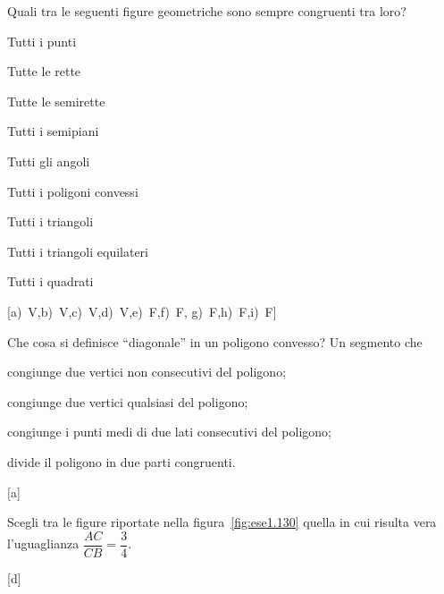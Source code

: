\begin{esercizio}
\label{ese:1.128}
Quali tra le seguenti figure geometriche sono sempre congruenti tra 
loro?
\begin{multicols}{2}
\begin{enumeratea}
\item Tutti i punti                \hfill \boxV\quad\boxF
\item Tutte le rette               \hfill \boxV\quad\boxF
\item Tutte le semirette           \hfill \boxV\quad\boxF
\item Tutti i semipiani            \hfill \boxV\quad\boxF
\item Tutti gli angoli             \hfill \boxV\quad\boxF
\item Tutti i poligoni convessi    \hfill \boxV\quad\boxF
\item Tutti i triangoli            \hfill \boxV\quad\boxF
\item Tutti i triangoli equilateri \hfill \boxV\quad\boxF
\item Tutti i quadrati             \hfill \boxV\quad\boxF
\end{enumeratea}
\end{multicols}
\hfill[a)~V,\quad b)~V,\quad c)~V,\quad d)~V,\quad e)~F,\quad f)~F,\quad 
g)~F,\quad h)~F,\quad i)~F]
\end{esercizio}


\begin{esercizio}
\label{ese:1.129}
Che cosa si definisce ``diagonale'' in un poligono convesso? Un 
segmento che
\begin{enumeratea}
\item congiunge due vertici non consecutivi del poligono;
\item congiunge due vertici qualsiasi del poligono;
\item congiunge i punti medi di due lati consecutivi del poligono;
\item divide il poligono in due parti congruenti.
\end{enumeratea}
\vspace{-2em}
\hfill[a]
\end{esercizio}

	
\begin{esercizio}
\label{ese:1.130}
Scegli tra le figure riportate nella figura~\ref{fig:ese1.130} quella 
in cui risulta vera l'uguaglianza $\dfrac{AC}{CB}=\dfrac{3}{4}$.
\begin{center}
\begin{inaccessibleblock}
 
\end{inaccessibleblock}
\end{center}
\vspace{-2.3em}
\hfill[d]
\end{esercizio}


